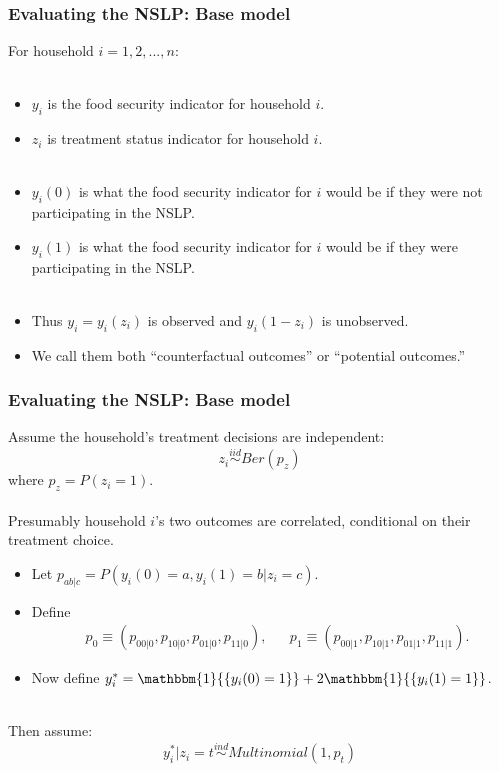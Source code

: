 \documentclass[xcolor=dvipsnames]{beamer}
\newcommand{\indicator}[1]{\mathbbm{1}{\left\{ {#1} \right\} }}
\begin{document}
\begin{frame}
  \frametitle{Evaluating the NSLP: Base model}
  For household $i=1,2,...,n$:\\~\\
\begin{itemize}
  \item $y_i$ is the food security indicator for household $i$. 
  \item $z_i$ is treatment status indicator for household $i$.\pause\\~
  \item $y_i(0)$ is what the food security indicator for $i$ would be if they were not participating in the NSLP.
  \item $y_i(1)$ is what the food security indicator for $i$ would be if they were participating in the NSLP.\pause\\~
  \item Thus $y_i = y_i(z_i)$ is observed and $y_i(1-z_i)$ is unobserved. 
  \item We call them both ``counterfactual outcomes'' or ``potential outcomes.''
\end{itemize}
\end{frame}


\begin{frame}
  \frametitle{Evaluating the NSLP: Base model}
Assume the household's treatment decisions are independent:
    \[
    z_i \stackrel{iid}{\sim}Ber(p_z)
    \]
    where $p_z=P(z_i=1)$.\\~\\
\pause Presumably household $i$'s two outcomes are correlated, conditional on their treatment choice. 
    \begin{itemize}
      \item Let $  p_{ab|c} = P(y_i(0)=a, y_i(1)=b|z_i=c)$.
      \item Define 
        \begin{align*}
          &p_0\equiv (p_{00|0}, p_{10|0}, p_{01|0}, p_{11|0}), &&p_1\equiv (p_{00|1}, p_{10|1}, p_{01|1}, p_{11|1}).
        \end{align*}
      \item Now define $y_i^*=\indicator{y_i(0)=1} + 2\indicator{y_i(1)=1}$. \\~
      \end{itemize}
\pause Then assume:
    \[
    y_i^*|z_i=t \stackrel{ind}{\sim}Multinomial(1,p_t)
    \]
\end{frame}
\end{document}
